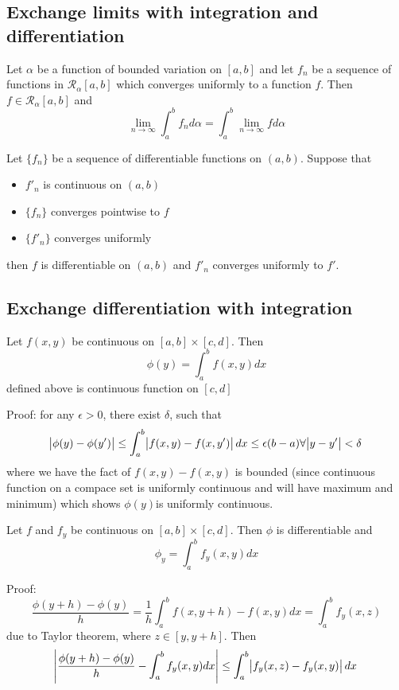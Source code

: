 \begin{refsection}
\subsection{Exchange limits with integration and differentiation}
\begin{theorem}
\cite[249]{johnsonbaugh2010foundations} Let $\alpha$ be a function of bounded variation on $[a,b]$ and let $f_n$ be a sequence of functions in $\mathcal{R}_\alpha [a,b]$ which converges uniformly to a function $f$. Then $f \in \mathcal{R}_\alpha [a,b]$ and
$$\lim_{n\to \infty} \int_a^b f_n d\alpha = \int_a^b \lim_{n \to \infty} f d\alpha$$
\end{theorem}


\begin{theorem}
\cite[249]{johnsonbaugh2010foundations} Let $\{f_n\}$ be a sequence of differentiable functions on $(a,b)$. Suppose that
\begin{itemize}
    \item $f'_n$ is continuous on $(a,b)$
    \item $\{f_n\}$ converges pointwise to $f$
    \item $\{f'_n\}$ converges uniformly
\end{itemize}
then $f$ is differentiable on $(a,b)$ and $f'_n$ converges uniformly to $f'$.
\end{theorem}


\subsection{Exchange differentiation with integration}
\begin{theorem}
Let $f(x,y)$ be continuous on $[a,b]\times [c,d]$. Then $$\phi(y) = \int_a^b f(x,y) dx$$ defined above is continuous function on $[c,d]$
\end{theorem}
Proof: for any $\epsilon > 0$, there exist $\delta$, such that 
$$\abs{\phi(y)-\phi(y')} \leq \int_a^b \abs{f(x,y)-f(x,y')} dx \leq \epsilon (b-a) \forall \abs{y-y'} <\delta$$
where we have the fact of $f(x,y)-f(x,y)$ is bounded (since continuous function on a compace set is uniformly continuous and will have maximum and minimum)
which shows $\phi(y)$is uniformly continuous. 


\begin{theorem}
Let $f$ and $f_y$ be continuous on $[a,b]\times [c,d]$. Then $\phi$ is differentiable and 
$$\phi_y = \int_a^b f_y(x,y) dx$$
\end{theorem}

Proof: 
$$\frac{\phi(y+h)-\phi(y)}{h} = \frac{1}{h}\int_a^b f(x,y+h) - f(x,y) dx = \int_a^b f_y(x,z)$$
due to Taylor theorem, where $z \in [y,y+h]$.
Then
$$\abs{\frac{\phi(y+h)-\phi(y)}{h} - \int_a^b f_y(x,y) dx} \leq \int_a^b \abs{f_y(x,z) - f_y(x,y)} dx$$


\end{refsection}
